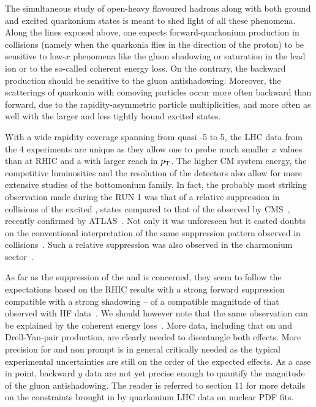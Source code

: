 \documentclass[../report.tex]{subfiles}
\begin{document}
The simultaneous study of open-heavy flavoured hadrons along with both ground and excited quarkonium states is meant to shed light of all these phenomena. Along the lines exposed above, one expects forward-quarkonium production in \pPb collisions (namely when the quarkonia flies in the direction of the proton) to be sensitive to low-$x$ phenomena like the gluon shadowing or saturation in the lead ion or to the so-called coherent energy loss. On the contrary, the backward production should be sensitive to the gluon antishadowing. Moreover, the scatterings of quarkonia with comoving particles occur more often backward than forward, due to the rapidity-asymmetric particle multiplicities, and more often as well with the larger and less tightly bound excited states. 
   
With a wide rapidity coverage spanning from quasi -5 to 5, the LHC data from the 4 experiments are unique as they allow one to probe much smaller $x$ values than at RHIC and a with larger reach in $p\sb{\scriptstyle\mathrm{T}}$. The higher CM system energy, the competitive luminosities and the resolution of the detectors also allow for more extensive studies of the bottomonium family. In fact, the probably most striking observation made during the RUN 1 was that of a relative suppression in \pPb collisions of the excited , states compared to that of the  observed by CMS~\cite{Chatrchyan:2013nza}, recently confirmed by ATLAS~\cite{Aaboud:2017cif}. Not only it was unforeseen but it casted doubts on the conventional interpretation of the same suppression pattern observed in \PbPb collisions~\cite{Chatrchyan:2012lxa}. Such a relative suppression was also observed in the charmonium sector~\cite{Abelev:2014zpa}.

As far as the suppression of the  and \PJgy is concerned, they seem to follow the expectations based on the RHIC results with a strong forward suppression compatible with a strong shadowing -- of a compatible magnitude of that observed with HF data~\cite{Kusina:2017gkz}. We should however note that the same observation can be explained by the coherent energy loss~\cite{Arleo:2010rb}. More data, including that on \PGU and Drell-Yan-pair production, are clearly needed to disentangle both effects. More precision for \PGU and non prompt \PJgy is in general critically needed as the typical experimental uncertainties are still on the order of the expected effects. As a case in point, backward $y$ data are not yet precise enough to quantify the magnitude of the gluon antishadowing.  The reader is referred to section 11 for more details on the constraints brought in by quarkonium \pPb LHC data on nuclear PDF fits.
\end{document}
